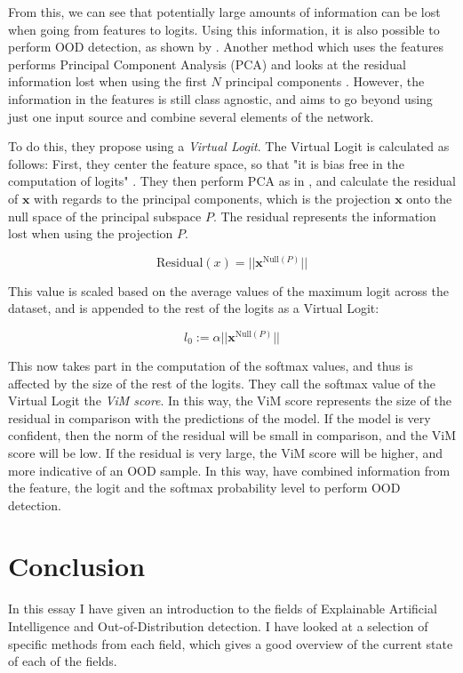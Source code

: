 \documentclass[conference,onecolumn]{IEEEtran}
\begin{document}
From this, we can see that potentially large amounts of information can be lost when going from features to logits. Using this information, it is also possible to perform OOD detection, as shown by \cite{nusa}. Another method which uses the features performs Principal Component Analysis (PCA) and looks at the residual information lost when using the first $N$ principal components \cite{subspace}. However, the information in the features is still class agnostic, and \cite{vim} aims to go beyond using just one input source and combine several elements of the network.

To do this, they propose using a {\it Virtual Logit}. The Virtual Logit is calculated as follows: First, they center the feature space, so that "it is bias free in the computation of logits" \cite{vim}. They then perform PCA as in \cite{subspace}, and calculate the residual of $\bm{x}$ with regards to the principal components, which is the projection $\bm{x}$ onto the null space of the principal subspace $P$. The residual represents the information lost when using the projection $P$.

\begin{equation}
\text{Residual}(x) = || \bm{x}^{\text{Null}(P)}||
\label{virtuallogit}
\end{equation}

This value is scaled based on the average values of the maximum logit across the dataset, and is appended to the rest of the logits as a Virtual Logit:

\begin{equation}
l_0 := \alpha || \bm{x}^{\text{Null}(P)}||
\label{virtuallogit}
\end{equation}

This now takes part in the computation of the softmax values, and thus is affected by the size of the rest of the logits. They call the softmax value of the Virtual Logit the {\it ViM score}. In this way, the ViM score represents the size of the residual in comparison with the predictions of the model. If the model is very confident, then the norm of the residual will be small in comparison, and the ViM score will be low. If the residual is very large, the ViM score will be higher, and more indicative of an OOD sample. In this way, \cite{vim} have combined information from the feature, the logit and the softmax probability level to perform OOD detection.

\section{Conclusion}

In this essay I have given an introduction to the fields of Explainable Artificial Intelligence and Out-of-Distribution detection. I have looked at a selection of specific methods from each field, which gives a good overview of the current state of each of the fields.




\end{document}

